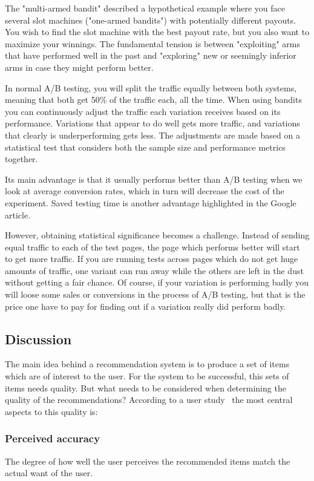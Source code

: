 The "multi-armed bandit" described a hypothetical example where you face
several slot machines ("one-armed bandits") with potentially different payouts.
You wish to find the slot machine with the best payout rate, but you also want
to maximize your winnings. The fundamental tension is between "exploiting" arms
that have performed well in the past and "exploring" new or seemingly inferior
arms in case they might perform better.

In normal A/B testing, you will split the traffic equally between both systems,
meaning that both get 50\% of the traffic each, all the time. When using
bandits you can continuously adjust the traffic each variation receives based
on its performance. Variations that appear to do well gets more traffic, and
variations that clearly is underperforming gets less. The adjustments are made
based on a statistical test that considers both the sample size and performance
metrics together.

Its main advantage is that it usually performs better than A/B testing when we
look at average conversion rates, which in turn will decrease the cost of the
experiment.  Saved testing time is another advantage highlighted in the Google
article.

However, obtaining statistical significance becomes a challenge. Instead of
sending equal traffic to each of the test pages, the page which performs better
will start to get more traffic. If you are running tests across pages which do
not get huge amounts of traffic, one variant can run away while the others are
left in the dust without getting a fair chance. Of course, if your variation is
performing badly you will loose some sales or conversions in the process of A/B
testing, but that is the price one have to pay for finding out if a variation
really did perform badly.

\subsection{Discussion}

The main idea behind a recommendation system is to produce a set of items which
are of interest to the user.  For the system to be successful, this sets of
items needs quality.  But what needs to be considered when determining the
quality of the recommendations?  According to a user
study~\cite{Pu:2011:UEF:2043932.2043962} the most central aspects to this
quality is:

\subsubsection{Perceived accuracy}
The degree of how well the user perceives the recommended items match the actual want of the user.

